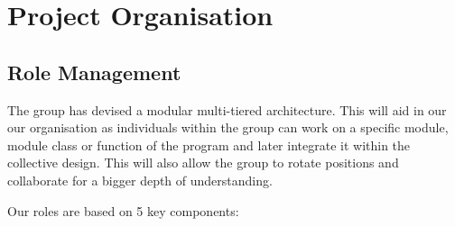 \documentclass[11pt]{article}
\begin{document}
\section{Project Organisation}

\subsection{Role Management}

The group has devised a modular multi-tiered architecture. This will aid in our our organisation as individuals within the group can work on a specific module, module class or function of the program and later integrate it within the collective design. This will also allow the group to rotate positions and collaborate for a bigger depth of understanding.

Our roles are based on 5 key components:
\end{document}
